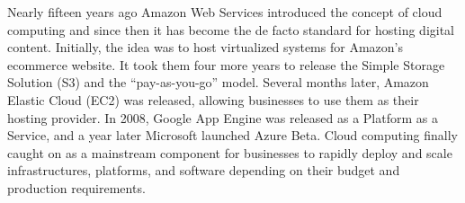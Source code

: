 \documentclass[./main.tex]{subfiles}
\begin{document}
Nearly fifteen years ago Amazon Web Services introduced the concept of cloud computing and since then it has become the de facto standard for hosting digital content. Initially, the idea was to host virtualized systems for Amazon’s ecommerce website. It took them four more years to release the Simple Storage Solution (S3) and the “pay-as-you-go” model. Several months later, Amazon Elastic Cloud (EC2) was released, allowing businesses to use them as their hosting provider. In 2008, Google App Engine was released as a Platform as a Service, and a year later Microsoft launched Azure Beta. Cloud computing finally caught on as a mainstream component for businesses to rapidly deploy and scale infrastructures, platforms, and software depending on their budget and production requirements.
\end{document}
